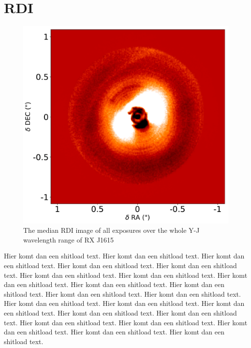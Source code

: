 \documentclass[twoside,single]{lion-msc}
\begin{document}
\section{RDI}
\begin{figure}
\centering
\includegraphics[width=\linewidth]{RDI_tot}
\caption{The median RDI image of all exposures over the whole Y-J wavelength range of RX J1615}
\label{fig:SDI_tot}
\end{figure}

Hier komt dan een shitload text. Hier komt dan een shitload text. Hier komt dan een shitload text. Hier komt dan een shitload text. Hier komt dan een shitload text. Hier komt dan een shitload text. Hier komt dan een shitload text. Hier komt dan een shitload text. Hier komt dan een shitload text. Hier komt dan een shitload text. Hier komt dan een shitload text. Hier komt dan een shitload text. Hier komt dan een shitload text. Hier komt dan een shitload text. Hier komt dan een shitload text. Hier komt dan een shitload text. Hier komt dan een shitload text. Hier komt dan een shitload text. Hier komt dan een shitload text. Hier komt dan een shitload text. Hier komt dan een shitload text. Hier komt dan een shitload text. 
\end{document}
